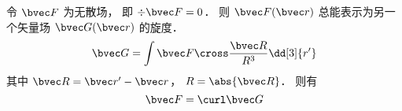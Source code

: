 

令 $\bvec F$ 为无散场， 即 $\div \bvec F = 0$． 则 $\bvec F(\bvec r)$ 总能表示为另一个矢量场 $\bvec G(\bvec r)$ 的旋度．
\begin{equation}
\bvec G = \int \bvec F \cross \frac{\bvec R}{R^3} \dd[3]{r'}
\end{equation}
其中 $\bvec R = \bvec r' - \bvec r$， $R = \abs{\bvec R}$． 则有
\begin{equation}
\bvec F = \curl \bvec G
\end{equation}


